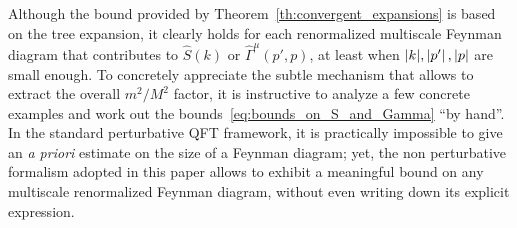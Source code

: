 \documentclass[a4paper, 11pt]{article}
\theoremstyle{thm}
\begin{document}
Although the bound provided by Theorem~\ref{th:convergent_expansions} is based on the tree expansion, it clearly holds for each renormalized multiscale Feynman diagram that contributes to $\hat{S}(k)$ or $\hat{\Gamma}^\mu(p', p)$, at least when $\abs{k}, \abs*{p'}, \abs{p}$ are small enough. To concretely appreciate the subtle mechanism that allows to extract the overall $m^2/M^2$ factor, it is instructive to analyze a few concrete examples and work out the bounds~\eqref{eq:bounds_on_S_and_Gamma} ``by hand''. In the standard perturbative QFT framework, it is practically impossible to give an \emph{a priori} estimate on the size of a Feynman diagram; yet, the non perturbative formalism adopted in this paper allows to exhibit a meaningful bound on any multiscale renormalized Feynman diagram, without even writing down its explicit expression.
\end{document}
